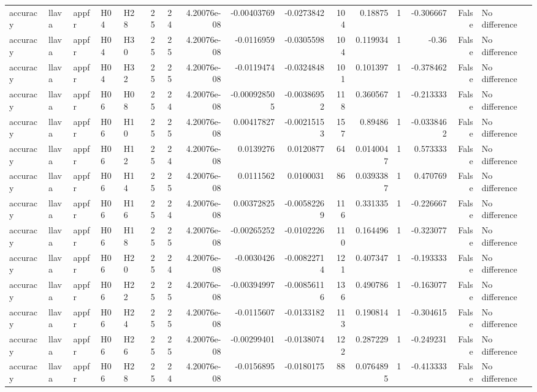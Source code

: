 \begin{longtable}{lllllrrrrrrrrrrl}
accuracy & llava & appfr & H04 & H28 & 25 & 24 & 4.20076e-08 & -0.00403769 & -0.0273842 & 104 & 0.18875 & 1 & -0.306667 & False & No difference \\
accuracy & llava & appfr & H04 & H30 & 25 & 25 & 4.20076e-08 & -0.0116959 & -0.0305598 & 104 & 0.119934 & 1 & -0.36 & False & No difference \\
accuracy & llava & appfr & H04 & H32 & 25 & 25 & 4.20076e-08 & -0.0119474 & -0.0324848 & 101 & 0.101397 & 1 & -0.378462 & False & No difference \\
accuracy & llava & appfr & H06 & H08 & 25 & 24 & 4.20076e-08 & -0.000928505 & -0.00386952 & 118 & 0.360567 & 1 & -0.213333 & False & No difference \\
accuracy & llava & appfr & H06 & H10 & 25 & 25 & 4.20076e-08 & 0.00417827 & -0.00215153 & 157 & 0.89486 & 1 & -0.0338462 & False & No difference \\
accuracy & llava & appfr & H06 & H12 & 25 & 24 & 4.20076e-08 & 0.0139276 & 0.0120877 & 64 & 0.0140047 & 1 & 0.573333 & False & No difference \\
accuracy & llava & appfr & H06 & H14 & 25 & 25 & 4.20076e-08 & 0.0111562 & 0.0100031 & 86 & 0.0393387 & 1 & 0.470769 & False & No difference \\
accuracy & llava & appfr & H06 & H16 & 25 & 24 & 4.20076e-08 & 0.00372825 & -0.00582269 & 116 & 0.331335 & 1 & -0.226667 & False & No difference \\
accuracy & llava & appfr & H06 & H18 & 25 & 25 & 4.20076e-08 & -0.00265252 & -0.0102226 & 110 & 0.164496 & 1 & -0.323077 & False & No difference \\
accuracy & llava & appfr & H06 & H20 & 25 & 24 & 4.20076e-08 & -0.0030426 & -0.00822714 & 121 & 0.407347 & 1 & -0.193333 & False & No difference \\
accuracy & llava & appfr & H06 & H22 & 25 & 25 & 4.20076e-08 & -0.00394997 & -0.00856116 & 136 & 0.490786 & 1 & -0.163077 & False & No difference \\
accuracy & llava & appfr & H06 & H24 & 25 & 25 & 4.20076e-08 & -0.0115607 & -0.0133182 & 113 & 0.190814 & 1 & -0.304615 & False & No difference \\
accuracy & llava & appfr & H06 & H26 & 25 & 25 & 4.20076e-08 & -0.00299401 & -0.0138074 & 122 & 0.287229 & 1 & -0.249231 & False & No difference \\
accuracy & llava & appfr & H06 & H28 & 25 & 24 & 4.20076e-08 & -0.0156895 & -0.0180175 & 88 & 0.0764895 & 1 & -0.413333 & False & No difference \\

\end{longtable}
